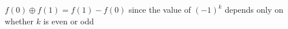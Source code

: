 \documentclass[preview]{standalone}
\begin{document}
\begin{center}
$f(0) \oplus f(1) = f(1) - f(0)$ since the value of $(-1)^k$ depends only on whether $k$ is even or odd
\end{center}
\end{document}
